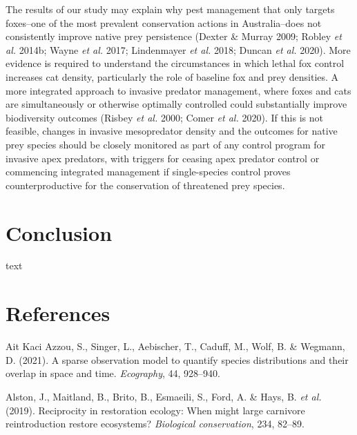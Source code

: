 \documentclass[11pt,a4paper,titlepage,twoside,openright]{style/unimelbthesis}
\begin{document}
\begin{mainmatter}
The results of our study may explain why pest management that only targets foxes--one of the most prevalent conservation actions in Australia--does not consistently improve native prey persistence (Dexter \& Murray 2009; Robley \emph{et al.} 2014b; Wayne \emph{et al.} 2017; Lindenmayer \emph{et al.} 2018; Duncan \emph{et al.} 2020). More evidence is required to understand the circumstances in which lethal fox control increases cat density, particularly the role of baseline fox and prey densities. A more integrated approach to invasive predator management, where foxes and cats are simultaneously or otherwise optimally controlled could substantially improve biodiversity outcomes (Risbey \emph{et al.} 2000; Comer \emph{et al.} 2020). If this is not feasible, changes in invasive mesopredator density and the outcomes for native prey species should be closely monitored as part of any control program for invasive apex predators, with triggers for ceasing apex predator control or commencing integrated management if single-species control proves counterproductive for the conservation of threatened prey species.

\hypertarget{conclusion}{%
\chapter*{Conclusion}\label{conclusion}}

text

\hypertarget{references}{%
\chapter*{References}\label{references}}


\noindent

\setlength{\parindent}{-0.20in}
\setlength{\leftskip}{0.20in}

\hypertarget{refs}{}
\leavevmode\hypertarget{ref-azzou2021sparse}{}%
Ait Kaci Azzou, S., Singer, L., Aebischer, T., Caduff, M., Wolf, B. \& Wegmann, D. (2021). A sparse observation model to quantify species distributions and their overlap in space and time. \emph{Ecography}, 44, 928--940.

\leavevmode\hypertarget{ref-alston2019reciprocity}{}%
Alston, J., Maitland, B., Brito, B., Esmaeili, S., Ford, A. \& Hays, B. \emph{et al.} (2019). Reciprocity in restoration ecology: When might large carnivore reintroduction restore ecosystems? \emph{Biological conservation}, 234, 82--89.


\end{mainmatter}
\end{document}
